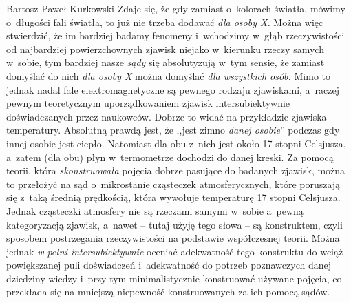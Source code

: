 \begin{artplenv}{Bartosz Paweł Kurkowski}
Zdaje się, że gdy zamiast o~kolorach światła, mówimy o~długości fali światła, to już nie trzeba dodawać \textit{dla
osoby X.} Można więc stwierdzić, że im bardziej badamy fenomeny i~wchodzimy w~głąb rzeczywistości od najbardziej
powierzchownych zjawisk niejako w~kierunku rzeczy samych w~sobie, tym bardziej nasze \textit{sądy} się
absolutyzują w~tym sensie, że zamiast  domyślać do nich \textit{dla osoby X} można domyślać \textit{dla wszystkich osób.}
Mimo to jednak nadal fale elektromagnetyczne są pewnego rodzaju zjawiskami, a~raczej pewnym teoretycznym
uporządkowaniem zjawisk intersubiektywnie doświadczanych przez naukowców. Dobrze to widać na przykładzie zjawiska
temperatury. Absolutną prawdą jest, że ,,jest zimno \textit{danej osobie}'' podczas gdy innej osobie jest ciepło.
Natomiast dla obu z~nich jest około 17 stopni Celsjusza, a~zatem (dla obu) płyn w~termometrze dochodzi do danej kreski.
Za pomocą teorii, która \textit{skonstruowała} pojęcia dobrze pasujące do badanych zjawisk, można to przełożyć
na sąd o~mikrostanie cząsteczek atmosferycznych, które poruszają się z~taką średnią prędkością, która wywołuje
temperaturę 17 stopni Celsjusza. Jednak cząsteczki atmosfery nie są rzeczami samymi w~sobie a~pewną kategoryzacją
zjawisk, a~nawet -- tutaj użyję tego słowa -- są konstruktem, czyli sposobem postrzegania rzeczywistości na
podstawie współczesnej teorii.
Można jednak \textit{w pełni intersubiektywnie }oceniać adekwatność tego konstruktu do wciąż powiększanej puli
doświadczeń i~adekwatność do potrzeb poznawczych danej dziedziny wiedzy
\parencite[s.~95]{grobler_prawda_2000}
i~przy tym minimalistycznie konstruować używane pojęcia, co przekłada się na mniejszą niepewność konstruowanych za ich
pomocą sądów.



\end{artplenv}
